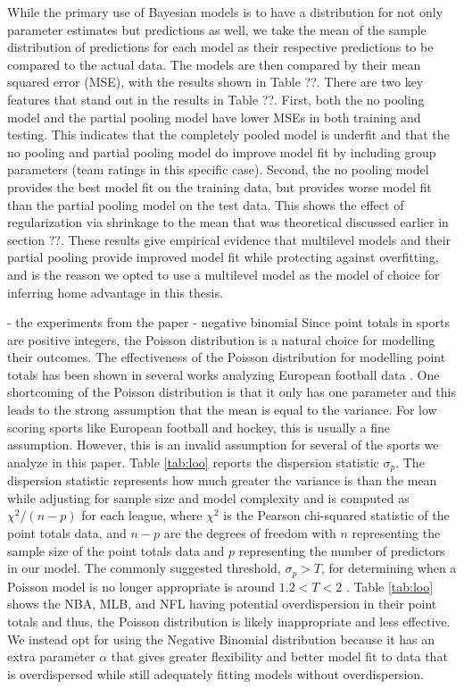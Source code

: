 While the primary use of Bayesian models is to have a distribution for not only parameter estimates but predictions as well, we take the mean of the sample distribution of predictions for each model as their respective predictions to be compared to the actual data. The models are then compared by their mean squared error (MSE), with the results shown in Table ??. There are two key features that stand out in the results in Table ??. First, both the no pooling model and the partial pooling model have lower MSEs in both training and testing. This indicates that the completely pooled model is underfit and that the no pooling and partial pooling model do improve model fit by including group parameters (team ratings in this specific case). Second, the no pooling model provides the best model fit on the training data, but provides worse model fit than the partial pooling model on the test data. This shows the effect of regularization via shrinkage to the mean that was theoretical discussed earlier in section ??. These results give empirical evidence that multilevel models and their partial pooling provide improved model fit while protecting against overfitting, and is the reason we opted to use a multilevel model as the model of choice for inferring home advantage in this thesis.

- the experiments from the paper
- negative binomial
Since point totals in sports are positive integers, the Poisson distribution is a natural choice for modelling their outcomes. The effectiveness of the Poisson distribution for modelling point totals has been shown in several works analyzing European football data \cite{Karlis2003} \cite{Baio2010} \cite{Benz2020}. One shortcoming of the Poisson distribution is that it only has one parameter and this leads to the strong assumption that the mean is equal to the variance. For low scoring sports like European football and hockey, this is usually a fine assumption. However, this is an invalid assumption for several of the sports we analyze in this paper. Table \ref{tab:loo} reports the dispersion statistic \(\sigma_p\). The dispersion statistic represents how much greater the variance is than the mean while adjusting for sample size and model complexity and is computed as  \(\chi^2/(n-p)\) for each league, where \(\chi^2\) is the Pearson chi-squared statistic of the point totals data, and \(n-p\) are the degrees of freedom with \(n\) representing the sample size of the point totals data and \(p\) representing the number of predictors in our model. The commonly suggested threshold, \(\sigma_p > T\), for determining when a Poisson model is no longer appropriate is around \(1.2 < T < 2\) \cite{Payne2018} \cite{Cameron1990}. Table \ref{tab:loo} shows the NBA, MLB, and NFL having potential overdispersion in their point totals and thus, the Poisson distribution is likely inappropriate and less effective. We instead opt for using the Negative Binomial distribution because it has an extra parameter \(\alpha\) that gives greater flexibility and better model fit to data that is overdispersed while still adequately fitting models without overdispersion.

